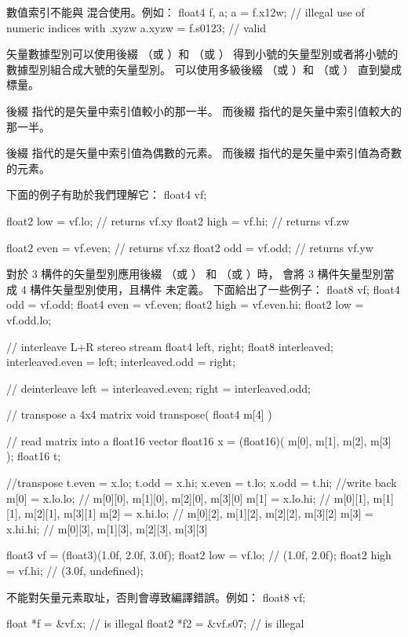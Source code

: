 數值索引不能與  混合使用。例如：
\startclc
float4 f, a;
a = f.x12w;	// illegal use of numeric indices with .xyzw
a.xyzw = f.s0123;	// valid
\stopclc

矢量數據型別可以使用後綴  （或 ）和  （或 ）
得到小號的矢量型別或者將小號的數據型別組合成大號的矢量型別。
可以使用多級後綴  （或 ）和  （或 ）
直到變成標量。

後綴  指代的是矢量中索引值較小的那一半。
而後綴  指代的是矢量中索引值較大的那一半。

後綴  指代的是矢量中索引值為偶數的元素。
而後綴  指代的是矢量中索引值為奇數的元素。

下面的例子有助於我們理解它：
\startclc
float4 vf;

float2 low = vf.lo;	// returns vf.xy
float2 high = vf.hi;	// returns vf.zw

float2 even = vf.even;	// returns vf.xz
float2 odd = vf.odd;	// returns vf.yw
\stopclc

對於 3 構件的矢量型別應用後綴  （或 ）
和  （或 ）時，
會將 3 構件矢量型別當成 4 構件矢量型別使用，且構件  未定義。
下面給出了一些例子：
\startclc
float8	vf;
float4	odd = vf.odd;
float4	even = vf.even;
float2	high = vf.even.hi;
float2	low = vf.odd.lo;

// interleave L+R stereo stream
float4	left, right;
float8	interleaved;
interleaved.even = left;
interleaved.odd = right;

// deinterleave
left = interleaved.even;
right = interleaved.odd;

// transpose a 4x4 matrix
void transpose( float4 m[4] )
{
	// read matrix into a float16 vector
	float16 x = (float16)( m[0], m[1], m[2], m[3] );
	float16 t;

	//transpose
	t.even = x.lo;
	t.odd = x.hi;
	x.even = t.lo;
	x.odd = t.hi;
	//write back
	m[0] = x.lo.lo;	// { m[0][0], m[1][0], m[2][0], m[3][0] }
	m[1] = x.lo.hi;	// { m[0][1], m[1][1], m[2][1], m[3][1] }
	m[2] = x.hi.lo;	// { m[0][2], m[1][2], m[2][2], m[3][2] }
	m[3] = x.hi.hi;	// { m[0][3], m[1][3], m[2][3], m[3][3] }
}

float3	vf = (float3)(1.0f, 2.0f, 3.0f);
float2	low = vf.lo; // (1.0f, 2.0f);
float2	high = vf.hi; // (3.0f, undefined);
\stopclc

不能對矢量元素取址，否則會導致編譯錯誤。例如：
\startclc
float8	vf;

float	*f = &vf.x;		// is illegal
float2	*f2 = &vf.s07;		// is illegal

